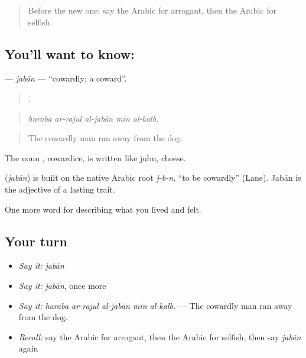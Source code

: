 \label{lesson:AR-C500-jaban}



\begin{quote}
Before the new one: say the Arabic for arrogant, then the Arabic for selfish.
\end{quote}

\subsection*{You'll want to know: }
\textbf{} — \emph{jabān} — \textquotedblleft{}cowardly; a coward\textquotedblright{}.

\begin{quote}
    .
\end{quote}

\begin{quote}
\emph{haraba ar-rajul al-jabān min al-kalb.}
\end{quote}

\begin{quote}
The cowardly man ran away from the dog.
\end{quote}

The noun , cowardice, is written like jubn, cheese.

\begin{cousinweb}
\textbf{} (\emph{jabān}) is built on the native Arabic root \emph{j-b-n}, \textquotedblleft{}to be cowardly\textquotedblright{} (Lane). Jabān is the adjective of a lasting trait.
\end{cousinweb}

\begin{grammarlens}[title={What you've built}]
One more word for describing what you lived and felt.
\end{grammarlens}

\subsection*{Your turn}
\begin{itemize}
\raggedright
  \item \emph{Say it:} \emph{jabān}
  \item \emph{Say it:} \emph{jabān}, once more
  \item \emph{Say it:} \emph{haraba ar-rajul al-jabān min al-kalb.} — The cowardly man ran away from the dog.
  \item \emph{Recall:} say the Arabic for arrogant, then the Arabic for selfish, then say \emph{jabān} again
\end{itemize}

